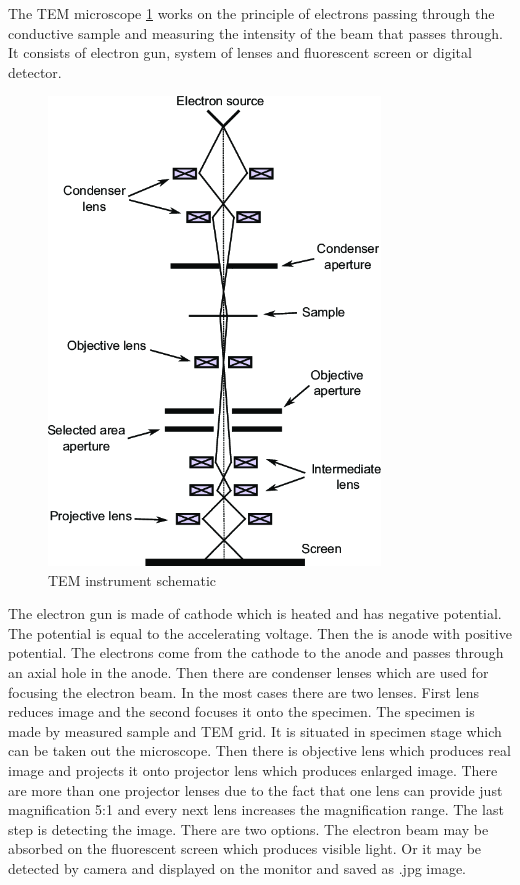 \documentclass[a4paper,12pt]{article}   %
\numberwithin{equation}{section}        %
\begin{document}
        The TEM microscope \ref{fig:TEM} works on the principle of electrons passing through the conductive sample and measuring the intensity of the beam that passes through.
        It consists of electron gun, system of lenses and fluorescent screen or digital detector.

        \begin{figure}[h]
            \centerline{\includegraphics[width=250pt]{tem_principle.png}}
            \caption{TEM instrument schematic}
            \label{fig:TEM}
        \end{figure}

        The electron gun is made of cathode which is heated and has negative potential. The potential is equal to the accelerating voltage. Then the is anode with positive potential.
        The electrons come from the cathode to the anode and passes through an axial hole in the anode. Then there are condenser lenses which are used for focusing the electron beam.
        In the most cases there are two lenses. First lens reduces image and the second focuses it onto the specimen. The specimen is made by measured sample and TEM grid.
        It is situated in specimen stage which can be taken out the microscope. Then there is objective lens which produces real image and projects it onto projector lens
        which produces enlarged image. There are more than one projector lenses due to the fact that one lens can provide just magnification 5:1
        and every next lens increases the magnification range. The last step is detecting the image. There are two options. The electron beam may be absorbed on the fluorescent screen
        which produces visible light. Or it may be detected by camera and displayed on the monitor and saved as .jpg image. 
\end{document}
